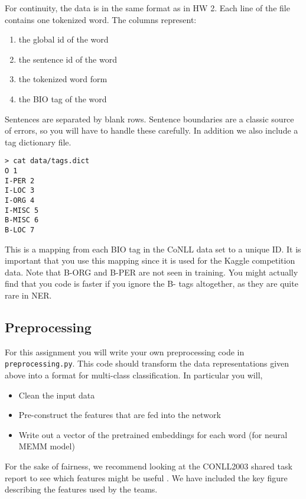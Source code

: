 \documentclass[11pt]{article}
\begin{document}
\vspace{0.5cm}

For continuity, the data is in the same format as in HW 2. 
Each line of the file contains one tokenized word. The columns represent:

\begin{enumerate}
\item the global id of the word
\item the sentence id of the word
\item the tokenized word form
\item the BIO tag of the word
\end{enumerate}

\noindent Sentences are separated by blank rows. Sentence boundaries are a
classic source of errors, so you will have to handle these carefully. In addition we also include a tag dictionary file. 

\begin{verbatim}
> cat data/tags.dict 
O 1
I-PER 2
I-LOC 3
I-ORG 4
I-MISC 5
B-MISC 6
B-LOC 7
\end{verbatim}

This is a mapping from each BIO tag in the CoNLL data set to
a unique ID. It is important that you use this mapping since it 
is used for the Kaggle competition data. Note that B-ORG and B-PER are 
not seen in training. You might actually find that you code is faster 
if you ignore the B- tags altogether, as they are quite rare in NER.

\subsection{Preprocessing}

For this assignment you will write your own preprocessing code
in \texttt{preprocessing.py}. This code should transform the
data representations given above into a format for multi-class
classification. In particular you will,

\begin{itemize}
\item Clean the input data 
\item Pre-construct the features that are fed into the network
\item Write out a vector of the pretrained embeddings for each word (for neural MEMM model)
\end{itemize}

For the sake of fairness, we recommend looking at the CONLL2003 shared task report to 
see which features might be useful \cite{tjong2003introduction}. We have included the key 
figure describing the features used by the teams.
\end{document}
